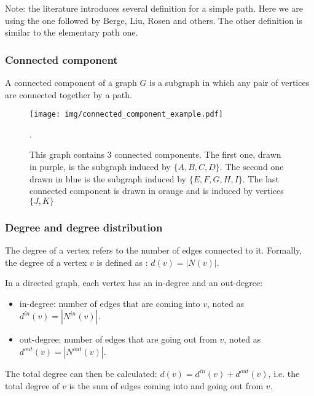 \documentclass[table]{report}
\begin{document}
Note: the literature introduces several definition for a simple path. Here we are using the one followed by Berge, Liu, Rosen and others. The other definition is similar to the elementary path one.


\subsubsection{Connected component}

A connected component of a graph $G$ is a subgraph in which any pair of vertices are connected together by a path.

\begin{figure}[h]%
\centering
\texttt{[image: img/connected\_component\_example.pdf]}
\caption{This graph contains 3 connected components. The first one, drawn in purple, is the subgraph induced by $\{A,B,C,D\}$. The second one drawn in blue is the subgraph induced by $\{E,F,G,H,I\}$. The last connected component is drawn in orange and is induced by vertices $\{J,K\}$}.

\label{fig:directed_weighted_examples}
\end{figure}


\subsubsection{Degree and degree distribution}

The degree of a vertex refers to the number of edges connected to it. Formally, the degree of a vertex $v$ is defined as : $d(v) = |N(v)|$.

In a directed graph, each vertex has an in-degree and an out-degree:
\begin{itemize}[noitemsep]
    \item in-degree: number of edges that are coming into $v$, noted as $d^{in}(v) = |N^{in}(v)|$.

    \item out-degree: number of edges that are going out from $v$, noted as $d^{out}(v) = |N^{out}(v)|$. 
\end{itemize}

The total degree can then be calculated: $d(v) = d^{in}(v) + d^{out}(v)$, i.e. the total degree of $v$ is the sum of edges coming into and going out from $v$.
\end{document}
